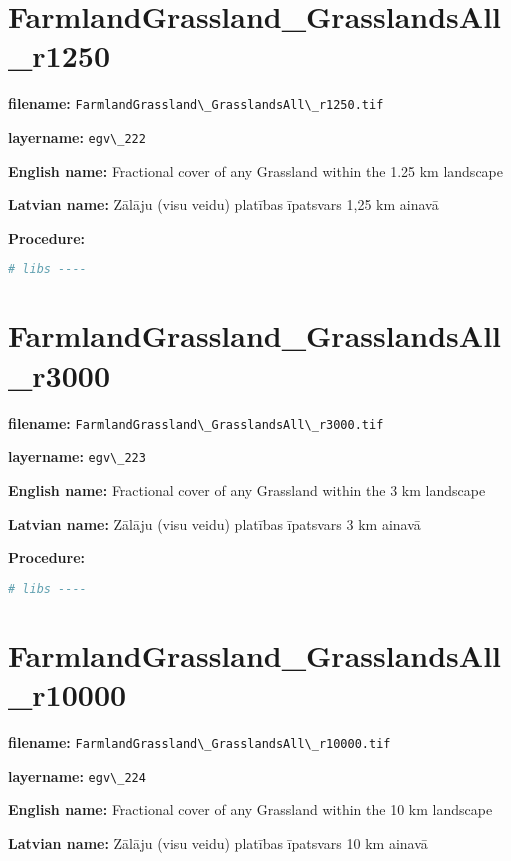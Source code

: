 \documentclass[
]{book}
\newcommand{\passthrough}[1]{#1}
\begin{document}
\section{FarmlandGrassland\_GrasslandsAll\_r1250}\label{ch06.222}

\textbf{filename:} \passthrough{\lstinline!FarmlandGrassland\_GrasslandsAll\_r1250.tif!}

\textbf{layername:} \passthrough{\lstinline!egv\_222!}

\textbf{English name:} Fractional cover of any Grassland within the 1.25 km landscape

\textbf{Latvian name:} Zālāju (visu veidu) platības īpatsvars 1,25 km ainavā

\textbf{Procedure:}

\begin{lstlisting}[language=R]
# libs ----
\end{lstlisting}

\section{FarmlandGrassland\_GrasslandsAll\_r3000}\label{ch06.223}

\textbf{filename:} \passthrough{\lstinline!FarmlandGrassland\_GrasslandsAll\_r3000.tif!}

\textbf{layername:} \passthrough{\lstinline!egv\_223!}

\textbf{English name:} Fractional cover of any Grassland within the 3 km landscape

\textbf{Latvian name:} Zālāju (visu veidu) platības īpatsvars 3 km ainavā

\textbf{Procedure:}

\begin{lstlisting}[language=R]
# libs ----
\end{lstlisting}

\section{FarmlandGrassland\_GrasslandsAll\_r10000}\label{ch06.224}

\textbf{filename:} \passthrough{\lstinline!FarmlandGrassland\_GrasslandsAll\_r10000.tif!}

\textbf{layername:} \passthrough{\lstinline!egv\_224!}

\textbf{English name:} Fractional cover of any Grassland within the 10 km landscape

\textbf{Latvian name:} Zālāju (visu veidu) platības īpatsvars 10 km ainavā
\end{document}

